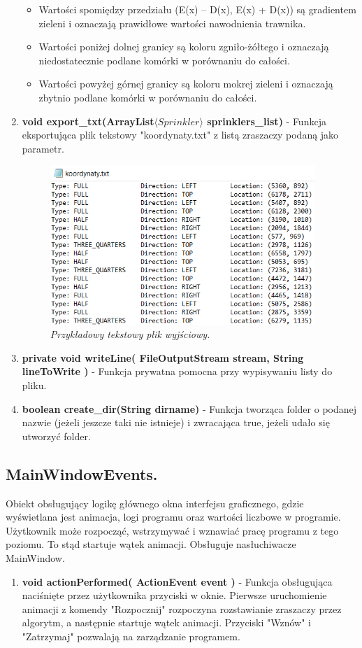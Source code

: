 \documentclass[a4paper]{article}
\begin{document}
\begin{enumerate}
\begin{itemize}
    \item Wartości spomiędzy przedziału (E(x) – D(x), E(x) + D(x)) są gradientem zieleni i oznaczają prawidłowe wartości nawodnienia trawnika.
    \item Wartości poniżej dolnej granicy są koloru zgniło-żółtego i oznaczają niedostatecznie podlane komórki w porównaniu do całości.
    \item Wartości powyżej górnej granicy są koloru mokrej zieleni i oznaczają zbytnio podlane komórki w porównaniu do całości.
\end{itemize}
    	\item \textbf{void export\_txt(ArrayList$\langle Sprinkler \rangle$ sprinklers\_list)} - Funkcja eksportująca plik tekstowy "koordynaty.txt" z listą zraszaczy podaną jako parametr.
\begin{figure}[H]
        \includegraphics[width=10cm]{koordynaty.png}
        \centering
        \caption{\textit{Przykładowy tekstowy plik wyjściowy.}}
\end{figure}
    	\item \textbf{private void writeLine( FileOutputStream stream, String lineToWrite )} - Funkcja prywatna pomocna przy wypisywaniu listy do pliku.
    	\item \textbf{boolean create\_dir(String dirname)} - Funkcja tworząca folder o podanej nazwie (jeżeli jeszcze taki nie istnieje) i zwracająca true, jeżeli udało się utworzyć folder.
\end{enumerate}

\subsection{MainWindowEvents.}
Obiekt obsługujący logikę głównego okna interfejsu graficznego, gdzie wyświetlana jest animacja, logi programu oraz wartości liczbowe w programie. Użytkownik może rozpocząć, wstrzymywać i wznawiać pracę programu z tego poziomu. To stąd startuje wątek animacji. Obsługuje nasłuchiwacze MainWindow.
\begin{enumerate}
    	\item \textbf{void actionPerformed( ActionEvent event )} - Funkcja obsługująca naciśnięte przez użytkownika przyciski w oknie. Pierwsze uruchomienie animacji z komendy "Rozpocznij" rozpoczyna rozstawianie zraszaczy przez algorytm, a następnie startuje wątek animacji. Przyciski "Wznów" i "Zatrzymaj" pozwalają na zarządzanie programem.
\end{enumerate}
\end{document}
